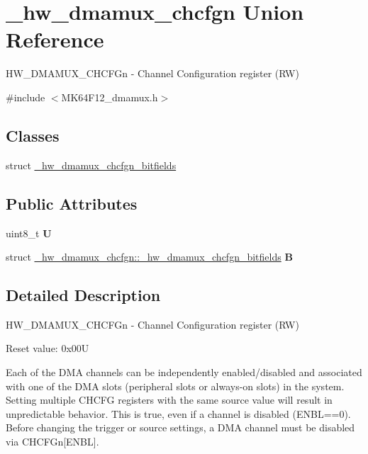\hypertarget{union__hw__dmamux__chcfgn}{}\section{\+\_\+hw\+\_\+dmamux\+\_\+chcfgn Union Reference}
\label{union__hw__dmamux__chcfgn}


H\+W\+\_\+\+D\+M\+A\+M\+U\+X\+\_\+\+C\+H\+C\+F\+Gn -\/ Channel Configuration register (RW)  




{\ttfamily \#include $<$M\+K64\+F12\+\_\+dmamux.\+h$>$}

\subsection*{Classes}
\begin{DoxyCompactItemize}
\item 
struct \hyperlink{struct__hw__dmamux__chcfgn_1_1__hw__dmamux__chcfgn__bitfields}{\+\_\+hw\+\_\+dmamux\+\_\+chcfgn\+\_\+bitfields}
\end{DoxyCompactItemize}
\subsection*{Public Attributes}
\begin{DoxyCompactItemize}
\item 
uint8\+\_\+t {\bfseries U}\hypertarget{union__hw__dmamux__chcfgn_a8578465ade7553a7afb1027396de11cf}{}\label{union__hw__dmamux__chcfgn_a8578465ade7553a7afb1027396de11cf}

\item 
struct \hyperlink{struct__hw__dmamux__chcfgn_1_1__hw__dmamux__chcfgn__bitfields}{\+\_\+hw\+\_\+dmamux\+\_\+chcfgn\+::\+\_\+hw\+\_\+dmamux\+\_\+chcfgn\+\_\+bitfields} {\bfseries B}\hypertarget{union__hw__dmamux__chcfgn_a87edf5a641cfaacbc82075c26c94513a}{}\label{union__hw__dmamux__chcfgn_a87edf5a641cfaacbc82075c26c94513a}

\end{DoxyCompactItemize}


\subsection{Detailed Description}
H\+W\+\_\+\+D\+M\+A\+M\+U\+X\+\_\+\+C\+H\+C\+F\+Gn -\/ Channel Configuration register (RW) 

Reset value\+: 0x00U

Each of the D\+MA channels can be independently enabled/disabled and associated with one of the D\+MA slots (peripheral slots or always-\/on slots) in the system. Setting multiple C\+H\+C\+FG registers with the same source value will result in unpredictable behavior. This is true, even if a channel is disabled (E\+N\+BL==0). Before changing the trigger or source settings, a D\+MA channel must be disabled via C\+H\+C\+F\+Gn\mbox{[}E\+N\+BL\mbox{]}. 

